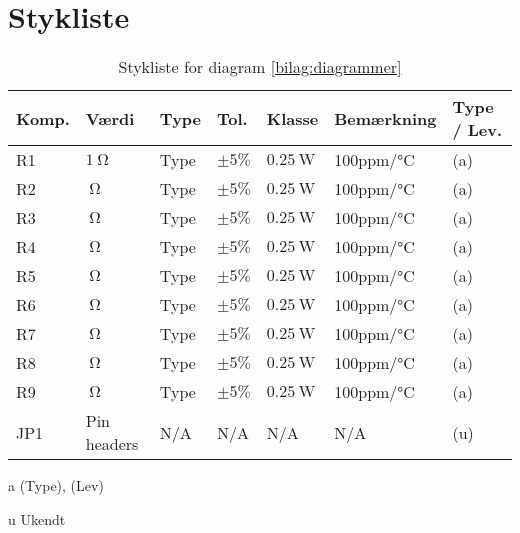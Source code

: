 \chapter{Stykliste} \label{bilag:styklister}

\begin{table}[h!]
\small
\caption{Stykliste for diagram \ref{bilag:diagrammer}}
\label{tab:styklister}
\begin{threeparttable}
\begin{tabular}{ l l l l l l l }
\toprule
\multicolumn{1}{l}{\textbf{Komp.}}       &
\multicolumn{1}{l}{\textbf{Værdi}}       &
\multicolumn{1}{l}{\textbf{Type}}       &
\multicolumn{1}{l}{\textbf{Tol.}} &
\multicolumn{1}{l}{\textbf{Klasse}} &
\multicolumn{1}{l}{\textbf{Bemærkning}} &
\multicolumn{1}{l}{\textbf{Type / Lev.}}  \\ 
\hline
R1 & $\SI{1}{\ohm}$			& Type	& $\pm 5\%$ 		 & $\SI{0.25}{\watt}$	  & 100ppm/\si{\celsius}  & (a) \\
R2 & $\SI{}{\ohm}$			& Type	& $\pm 5\%$ 		 & $\SI{0.25}{\watt}$	  & 100ppm/\si{\celsius}  & (a) \\
R3 & $\SI{}{\ohm}$			& Type	& $\pm 5\%$ 		 & $\SI{0.25}{\watt}$	  & 100ppm/\si{\celsius}  & (a) \\
R4 & $\SI{}{\ohm}$			& Type	& $\pm 5\%$ 		 & $\SI{0.25}{\watt}$	  & 100ppm/\si{\celsius}  & (a) \\
R5 & $\SI{}{\ohm}$			& Type	& $\pm 5\%$ 		 & $\SI{0.25}{\watt}$	  & 100ppm/\si{\celsius}  & (a) \\
R6 & $\SI{}{\ohm}$			& Type	& $\pm 5\%$ 		 & $\SI{0.25}{\watt}$	  & 100ppm/\si{\celsius}  & (a) \\
R7 & $\SI{}{\ohm}$			& Type	& $\pm 5\%$ 		 & $\SI{0.25}{\watt}$	  & 100ppm/\si{\celsius}  & (a) \\
R8 & $\SI{}{\ohm}$			& Type	& $\pm 5\%$ 		 & $\SI{0.25}{\watt}$	  & 100ppm/\si{\celsius}  & (a) \\
R9 & $\SI{}{\ohm}$			& Type	& $\pm 5\%$ 		 & $\SI{0.25}{\watt}$	  & 100ppm/\si{\celsius}  & (a) \\

JP1 & Pin headers & N/A & N/A & N/A & N/A & (u) \\

\hline
\bottomrule
\end{tabular}
\begin{tablenotes}
\item[a] (Type), (Lev)
\item[u] Ukendt
\end{tablenotes}
\end{threeparttable}
\end{table} 
